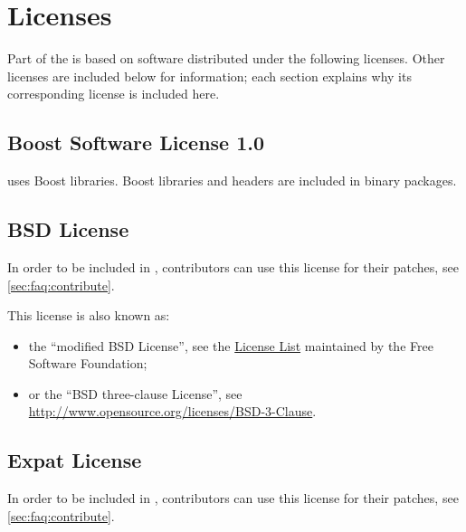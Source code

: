 
\chapter{Licenses}
\label{sec:licenses}

\newcommand{\inputLicense}[1]
{%
}

Part of the \usdk is based on software distributed under the following
licenses.  Other licenses are included below for information; each section
explains why its corresponding license is included here.


\section{Boost Software License 1.0}
\usdk uses Boost libraries.  Boost libraries and headers are included in
binary packages.

\inputLicense{boost-1.0}

\section{BSD License}
\label{sec:license:bsd}
In order to be included in \usdk, contributors can use this license for
their patches, see \autoref{sec:faq:contribute}.

This license is also known as:
\begin{itemize}
\item the ``modified BSD License'', see the
  \href{http://www.gnu.org/licenses/license-list.html}{License List}
  maintained by the Free Software Foundation;
\item or the ``BSD three-clause License'', see
  \url{http://www.opensource.org/licenses/BSD-3-Clause}.

\end{itemize}

\inputLicense{bsd}

\section{Expat License}
\label{sec:license:expat}
In order to be included in \usdk, contributors can use this license for
their patches, see \autoref{sec:faq:contribute}.


